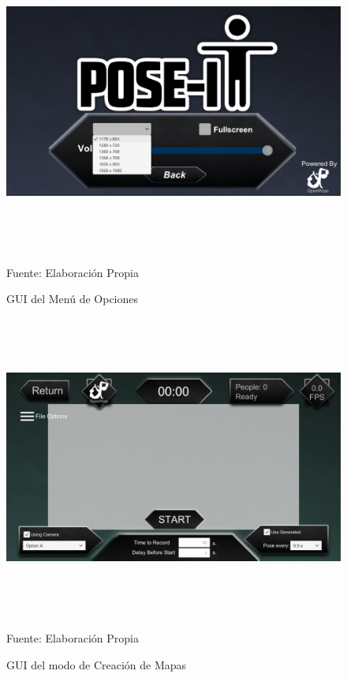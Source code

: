 \clearpage
\begin{figure}[h]
	\centering
	\includegraphics[width=16cm,height=10cm]{./Images/menuopciones2.png}
	\caption{GUI del Menú de Opciones}
	\footnotesize Fuente: Elaboración Propia
	\label{gui2}
\end{figure}

\clearpage
\begin{figure}[h]
	\centering
	\includegraphics[width=16cm,height=10cm]{./Images/crear1.png}
	\caption{GUI del modo de Creación de Mapas}
	\footnotesize Fuente: Elaboración Propia
	\label{gui3.1}
\end{figure}

